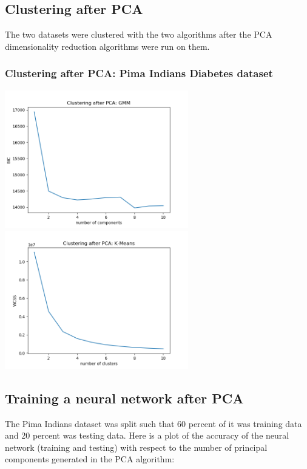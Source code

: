 \documentclass[11pt]{article}
\begin{document}
            \subsection{Clustering after PCA}

            The two datasets were clustered with the two algorithms
            after the PCA dimensionality reduction algorithms were run
            on them.

            \subsubsection{Clustering after PCA: Pima Indians Diabetes dataset}

            \includegraphics[width=8cm]{../pima/clustering2/gmm_pca.png}
            \includegraphics[width=8cm]{../pima/clustering2/km_pca.png}

            \subsection{Training a neural network after PCA}

            The Pima Indians dataset was split such that 60 percent of it
            was training data and 20 percent was testing data. Here is a plot
            of the accuracy of the neural network (training and testing) with
            respect to the number of principal components generated in the
            PCA algorithm:
\end{document}
